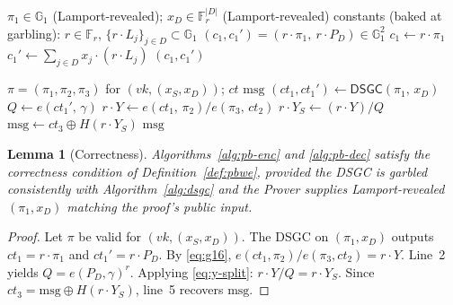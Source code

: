 \documentclass[11pt]{article}
\newtheorem{lemma}{Lemma}
\newcommand{\Gone}{\mathbb{G}_1}
\newcommand{\Fr}{\mathbb{F}_r}
\newcommand{\msg}{\mathrm{msg}}
\newcommand{\Dec}{\mathsf{Dec}}
\begin{document}
\begin{algorithm}[H]
\caption{$\mathsf{DSGC}$ functionality \hfill{\footnotesize garbled at $T_0$, evaluated at $T_2$}}
\label{alg:dsgc}
\begin{algorithmic}[1]
\Require $\pi_1 \in \Gone$ (Lamport-revealed); $x_D \in \Fr^{|D|}$ (Lamport-revealed)
  \Statex constants (baked at garbling): $r \in \Fr$, $\{r \cdot L_j\}_{j \in D} \subset \Gone$
\Ensure $(c_1, c_1') = (r \cdot \pi_1,\ r \cdot P_D) \in \Gone^2$
\State $c_1 \gets r \cdot \pi_1$ 
\State $c_1' \gets \sum_{j \in D} x_j \cdot (r \cdot L_j)$ 
\State \Return $(c_1, c_1')$
\end{algorithmic}
\end{algorithm}

\begin{algorithm}[H]
\caption{$\Dec^\star(\pi, x = (x_S, x_D), ct)$ \hfill{\footnotesize Prover, off-chain, $T_2$}}
\label{alg:pb-dec}
\begin{algorithmic}[1]
\Require $\pi = (\pi_1, \pi_2, \pi_3)$ for $(vk, (x_S, x_D))$; $ct$
\Ensure $\msg$
\State $(ct_1, ct_1') \gets \mathsf{DSGC}(\pi_1,\, x_D)$ 
\State $Q \gets e(ct_1',\, \gamma)$ 
\State $r \cdot Y \gets e(ct_1,\, \pi_2) / e(\pi_3,\, ct_2)$ 
\State $r \cdot Y_S \gets (r \cdot Y) / Q$ 
\State $\msg \gets ct_3 \oplus H(r \cdot Y_S)$
\State \Return $\msg$
\end{algorithmic}
\end{algorithm}

\begin{lemma}[Correctness]\label{lem:correct}
Algorithms~\ref{alg:pb-enc} and \ref{alg:pb-dec} satisfy the
correctness condition of Definition~\ref{def:pbwe}, provided the
DSGC is garbled consistently with Algorithm~\ref{alg:dsgc} and the
Prover supplies Lamport-revealed $(\pi_1, x_D)$ matching the proof's
public input.
\end{lemma}

\begin{proof}
Let $\pi$ be valid for $(vk, (x_S, x_D))$. The DSGC on
$(\pi_1, x_D)$ outputs $ct_1 = r \cdot \pi_1$ and
$ct_1' = r \cdot P_D$. By \eqref{eq:g16},
$e(ct_1, \pi_2) / e(\pi_3, ct_2) = r \cdot Y$. Line~2 yields
$Q = e(P_D, \gamma)^r$. Applying \eqref{eq:y-split}:
$r \cdot Y / Q = r \cdot Y_S$. Since
$ct_3 = \msg \oplus H(r \cdot Y_S)$, line~5 recovers $\msg$.
\end{proof}
\end{document}
